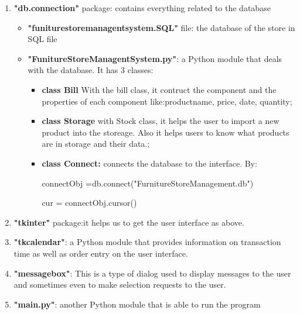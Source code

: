\begin{enumerate}
  \item \textbf{"db.connection"} package: contains everything related to the database
    \begin{itemize}
        \item \textbf{"funiturestoremanagentsystem.SQL"} file: the database of the store in SQL file
        \item \textbf{"FunitureStoreManagentSystem.py"}: a Python module that deals with the database. It has 3 classes: 
            \begin{itemize}
                \item \textbf{class Bill} With the bill class, it contruct the component and the properties of each component like:productname, price, date, quantity;
                
                \item \textbf{class Storage} with Stock class, it helps the user to import a new product into the storeage. Also it helps users to know what products are in storage and their data.;
                
                \item \textbf{class Connect: } connects the database to the interface. By:
                
                connectObj =db.connect("FurnitureStoreManagement.db")
                
                cur = connectObj.cursor()
            \end{itemize}
    \end{itemize}
  \item \textbf{"tkinter"} package:it helps us to get the user interface as above.
  \item \textbf{"tkcalendar"}: a Python module that provides information on transaction time as well as order entry on the user interface. 
  \item \textbf{"messagebox"}: This is a type of dialog used to display messages to the user and sometimes even to make selection requests to the user.
  
  \item \textbf{"main.py"}: another Python module that is able to run the program
\end{enumerate}